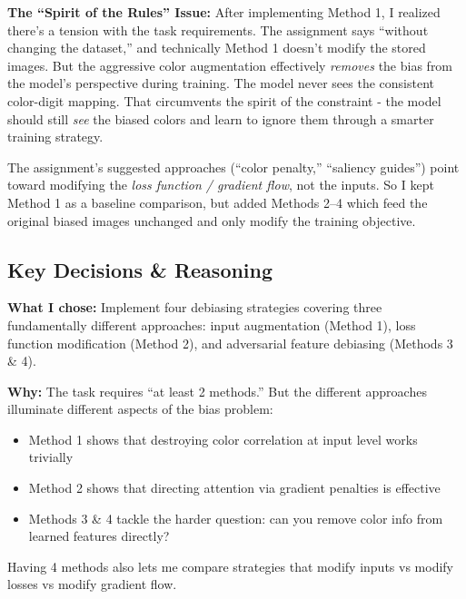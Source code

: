 \documentclass[9pt,a4paper,twocolumn,twoside]{tau-class/tau}
\begin{document}
        \begin{note}
            \textbf{The ``Spirit of the Rules'' Issue:} After implementing Method 1, I realized there's a tension with the task requirements. The assignment says ``without changing the dataset,'' and technically Method 1 doesn't modify the stored images. But the aggressive color augmentation effectively \textit{removes} the bias from the model's perspective during training. The model never sees the consistent color-digit mapping. That circumvents the spirit of the constraint - the model should still \textit{see} the biased colors and learn to ignore them through a smarter training strategy.

            The assignment's suggested approaches (``color penalty,'' ``saliency guides'') point toward modifying the \textit{loss function / gradient flow}, not the inputs. So I kept Method 1 as a baseline comparison, but added Methods 2--4 which feed the original biased images unchanged and only modify the training objective.
        \end{note}

    \subsection{Key Decisions \& Reasoning}

        \begin{tauenv}[frametitle=Decision: Implement 4 Methods Instead of the Required 2]
            \textbf{What I chose:} Implement four debiasing strategies covering three fundamentally different approaches: input augmentation (Method 1), loss function modification (Method 2), and adversarial feature debiasing (Methods 3 \& 4).

            \textbf{Why:} The task requires ``at least 2 methods.'' But the different approaches illuminate different aspects of the bias problem:
            \begin{itemize}
                \item Method 1 shows that destroying color correlation at input level works trivially
                \item Method 2 shows that directing attention via gradient penalties is effective
                \item Methods 3 \& 4 tackle the harder question: can you remove color info from learned features directly?
            \end{itemize}

            Having 4 methods also lets me compare strategies that modify inputs vs modify losses vs modify gradient flow.
        \end{tauenv}
\end{document}
